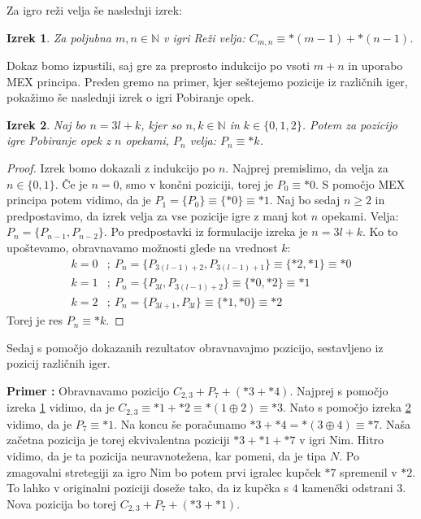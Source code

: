 \documentclass[a4paper, 10pt]{article}
\newtheorem{izr}{Izrek}
\newcounter{primercount}
\newenvironment{primer}{\begin{flushleft}\refstepcounter{primercount}\textbf{Primer \arabic{primercount}:}}{\hfill\end{flushleft}}
\newcommand{\mth}[1]{\ensuremath{\mathbb{#1}}}
\newcommand{\N}{\mth{N}}
\begin{document}
	Za igro reži velja še naslednji izrek:
	\begin{izr}
		\label{izr:Reži}
		Za poljubna $m, n\in\N$ v igri Reži velja: $C_{m, n} \equiv *(m-1) + *(n-1)$.
	\end{izr}
	Dokaz bomo izpustili, saj gre za preprosto indukcijo po vsoti $m+n$ in uporabo MEX principa.
	Preden gremo na primer, kjer seštejemo pozicije iz različnih iger, pokažimo še naslednji izrek o igri Pobiranje opek.
	
	\begin{izr}
		\label{izr:Pobiranje}
		Naj bo $n = 3l + k$, kjer so $n, k\in \N$ in $k\in \{0, 1, 2\}$. Potem za pozicijo igre Pobiranje opek z $n$ opekami, $P_n$ velja: $P_n \equiv *k$.
	\end{izr}
	\begin{proof}
		Izrek bomo dokazali z indukcijo po $n$. Najprej premislimo, da velja za $n\in \{0, 1\}$.
		Če je $n = 0$, smo v končni poziciji, torej je $P_0 \equiv *0$. S pomočjo MEX principa potem vidimo, da je $P_1 = \{P_0\}\equiv\{*0\}\equiv *1$. Naj bo sedaj $n \geq 2$ in predpostavimo, da izrek velja za vse pozicije igre z manj kot $n$ opekami. Velja: $P_n = \{P_{n-1}, P_{n-2}\}$. Po predpostavki iz formulacije izreka je $n = 3l + k$. Ko to upoštevamo, obravnavamo možnosti glede na vrednost $k$:
		\begin{align*}
			k = 0 &; ~P_n = \{P_{3(l-1)+2}, P_{3(l-1)+1}\} \equiv \{*2, *1\}\equiv *0 \\
			k = 1 &; ~P_n = \{P_{3l}, P_{3(l-1)+2}\} \equiv \{*0, *2\}\equiv *1 \\
			k = 2 &; ~P_n = \{P_{3l + 1}, P_{3l}\} \equiv \{*1, *0\}\equiv *2 
		\end{align*}
		Torej je res $P_n\equiv *k$.
	\end{proof}
	
	Sedaj s pomočjo dokazanih rezultatov obravnavajmo pozicijo, sestavljeno iz pozicij različnih iger.
	\begin{primer}
		Obravnavamo pozicijo $C_{2, 3} + P_7 + (*3 + *4)$. Najprej s pomočjo izreka \ref{izr:Reži} vidimo, da je $C_{2, 3}\equiv *1 + *2 \equiv *(1\oplus 2) \equiv *3$. Nato s pomočjo izreka \ref{izr:Pobiranje} vidimo, da je $P_7 \equiv *1$. Na koncu še poračunamo $*3 + *4 = *(3\oplus 4) \equiv *7$. Naša začetna pozicija je torej ekvivalentna poziciji $*3 + *1 + *7$ v igri Nim. Hitro vidimo, da je ta pozicija neuravnotežena, kar pomeni, da je tipa $N$. Po zmagovalni stretegiji za igro Nim bo potem prvi igralec kupček $*7$ spremenil v $*2$. To lahko v originalni poziciji doseže tako, da iz kupčka s $4$ kamenčki odstrani $3$. Nova pozicija bo torej $C_{2, 3} + P_7 + (*3 + *1)$.
	\end{primer}
	
\end{document}
